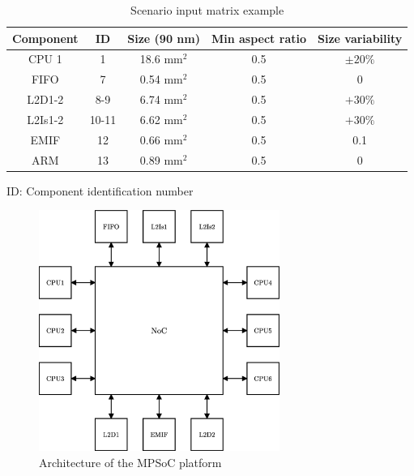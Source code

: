 \begin{table}[h!]
\caption{Scenario input matrix example}
\begin{center}
\begin{tabular}{|c|c|c|c|c|}
\hline Component & ID & Size (90 nm) & Min aspect ratio & Size variability\\
\hline CPU 1\texttildelow 6 & 1\texttildelow 6 & 18.6 mm$^2$ & 0.5 & $\pm20\%$\\
FIFO & 7 & 0.54 mm$^2$ & 0.5 & 0\\
L2D1-2 & 8-9 & 6.74 mm$^2$ & 0.5 & $+30\%$\\
L2Is1-2 & 10-11 & 6.62 mm$^2$ & 0.5 & $+30\%$\\
EMIF & 12 & 0.66 mm$^2$ & 0.5 & 0.1\\
ARM & 13 & 0.89 mm$^2$ & 0.5 & 0\\
\hline
\end{tabular}
\end{center}
\begin{center}
{\small ID: Component identification number}
\end{center}
\label{tab:scenarmat}
\end{table}

\begin{figure}[h!]
\begin{center}
\includegraphics[width=0.7\textwidth]{mpsoc.eps}
\end{center}
\vspace{-0.3cm}
\caption{Architecture of the MPSoC platform~\cite{dmilojev08b}}
\label{fig:imec3mf}
\end{figure}

